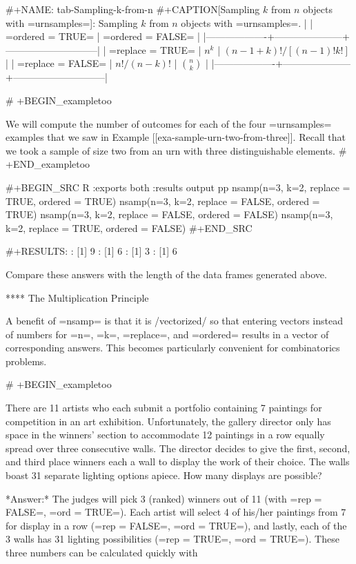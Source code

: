 #+NAME: tab-Sampling-k-from-n
#+CAPTION[Sampling \(k\) from \(n\) objects with =urnsamples=]: Sampling \(k\) from \(n\) objects with =urnsamples=.
|                   | =ordered = TRUE=    | =ordered = FALSE=           |
|-------------------+---------------------+-----------------------------|
| =replace = TRUE=  | \(n^{k}\)           | \((n-1+k)! / [(n-1)!k!]\)   |
| =replace = FALSE= | \( n! / (n-k)! \)   | \( {n \choose k} \)         |
|-------------------+---------------------+-----------------------------|


# +BEGIN_exampletoo

We will compute the number of outcomes for each of the four
=urnsamples= examples that we saw in Example
[[exa-sample-urn-two-from-three]]. Recall that we took a sample of size two from an
urn with three distinguishable elements.
# +END_exampletoo


#+BEGIN_SRC R :exports both :results output pp   
nsamp(n=3, k=2, replace = TRUE, ordered = TRUE) 
nsamp(n=3, k=2, replace = FALSE, ordered = TRUE) 
nsamp(n=3, k=2, replace = FALSE, ordered = FALSE) 
nsamp(n=3, k=2, replace = TRUE, ordered = FALSE) 
#+END_SRC 

#+RESULTS:
: [1] 9
: [1] 6
: [1] 3
: [1] 6

Compare these answers with the length of the data frames generated above.

**** The Multiplication Principle

A benefit of =nsamp= is that it is /vectorized/ so that entering
vectors instead of numbers for =n=, =k=, =replace=, and =ordered=
results in a vector of corresponding answers. This becomes
particularly convenient for combinatorics problems.

# +BEGIN_exampletoo

There are 11 artists who each submit a portfolio containing 7
paintings for competition in an art exhibition. Unfortunately, the
gallery director only has space in the winners' section to accommodate
12 paintings in a row equally spread over three consecutive walls. The
director decides to give the first, second, and third place winners
each a wall to display the work of their choice. The walls boast 31
separate lighting options apiece. How many displays are possible?

*Answer:* The judges will pick 3 (ranked) winners out of 11 (with =rep
= FALSE=, =ord = TRUE=). Each artist will select 4 of his/her
paintings from 7 for display in a row (=rep = FALSE=, =ord = TRUE=),
and lastly, each of the 3 walls has 31 lighting possibilities (=rep =
TRUE=, =ord = TRUE=). These three numbers can be calculated quickly
with

